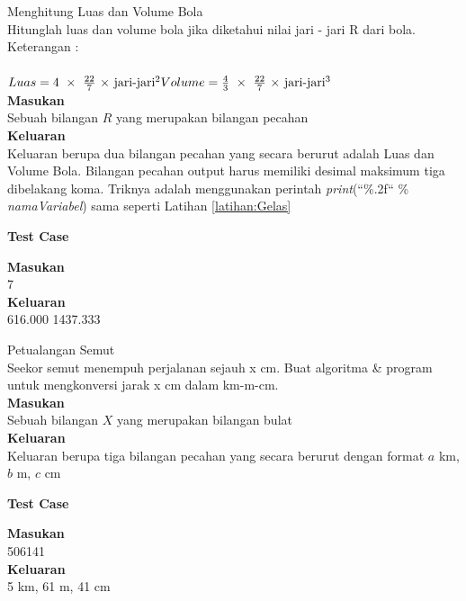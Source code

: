 \newpage
\begin{permasalahan}{Menghitung Luas dan Volume Bola}\\
\label{prob:Volume}
Hitunglah luas dan volume bola jika diketahui nilai jari - jari R dari bola. \\
Keterangan : \\
  \ \\
		\begin{math}
				Luas = 4\ \times\ \frac{22}{7}\ \times\ $jari-jari$^{2} \\
				Volume = \frac{4}{3}\ \times\ \frac{22}{7}\  \times\ $jari-jari$^{3} \\
		\end{math}
   \ \\
	\textbf{Masukan}\\
	Sebuah bilangan $R$ yang merupakan bilangan pecahan\\
	\textbf{Keluaran}\\
Keluaran berupa dua bilangan pecahan yang secara berurut adalah Luas dan Volume Bola. Bilangan pecahan output harus memiliki desimal maksimum tiga dibelakang koma. Triknya adalah menggunakan perintah  \textit{print}(``\%.2f`` \% \textit{namaVariabel}) sama seperti Latihan \ref{latihan:Gelas}
	\begin{center}
	\textbf{Test Case}\\
	\end{center}
	\textbf{Masukan}\\
	7\\
	\textbf{Keluaran}\\
	616.000 1437.333\\	
\end{permasalahan}

\newpage
\begin{permasalahan}{Petualangan Semut}\\
\label{prob:PetualanganSemut}
	Seekor semut menempuh perjalanan sejauh x cm. Buat algoritma \& program untuk mengkonversi jarak x cm dalam km-m-cm. \\
	\textbf{Masukan}\\
	Sebuah bilangan $X$ yang merupakan bilangan bulat\\
	\textbf{Keluaran}\\
	Keluaran berupa tiga bilangan pecahan yang secara berurut dengan format $a$ km, $b$ m, $c$ cm
	\begin{center}
	\textbf{Test Case}\\
	\end{center}
	\textbf{Masukan}\\
	506141\\
	\textbf{Keluaran}\\
	5 km, 61 m, 41 cm
\end{permasalahan}

